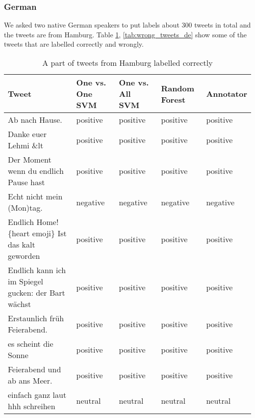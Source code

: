 \subsubsection{German}
We asked two native German speakers to put labels about 300 tweets in total and the tweets are from Hamburg.
Table \ref{tab:correct_tweets_de}, \ref{tab:wrong_tweets_de}  show some of the tweets that are labelled correctly and wrongly.
\begin{table}[ht]
	\caption{A part of tweets from Hamburg labelled correctly}
	\begin{tabular}{|p{5cm}|p{1.8cm}|p{1.8cm}|p{1.8cm}|p{1.8cm}|} \hline
	Tweet & One vs. One SVM &One vs. All SVM &Random Forest & Annotator\\ \hline

	Ab nach Hause. &positive&positive&positive&positive\\ \hline
	Danke euer Lehmi \&lt&positive&positive&positive&positive\\ \hline
	Der Moment wenn du endlich Pause hast &positive&positive&positive&positive\\ \hline
	Echt nicht mein (Mon)tag. &negative&negative&negative&negative\\ \hline
	Endlich Home! \{heart emoji\} Ist das kalt geworden &positive&positive&positive&positive\\ \hline

	Endlich kann ich im Spiegel gucken: der Bart w\"achst &positive&positive&positive&positive\\ \hline
	Erstaunlich fr\"uh Feierabend. &positive&positive&positive&positive\\ \hline
	es scheint die Sonne &positive&positive&positive&positive\\ \hline
	Feierabend und ab ans Meer. &positive&positive&positive&positive\\ \hline
	einfach ganz laut hhh schreihen&neutral &neutral&neutral&neutral\\ \hline

	
	
	\end{tabular}
	\label{tab:correct_tweets_de}
\end{table}


